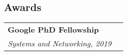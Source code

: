\documentclass[margin,line]{res}
\begin{document}
\begin{resume}


\section{\sc Awards}
\begin{tabular}{@{}p{5.5in}p{4in}}
{\bf Google PhD Fellowship}\\
{\small\em Systems and Networking, 2019}\\
\end{tabular}

\end{resume}
\end{document}
